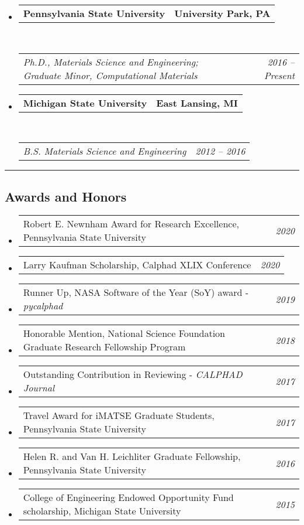 \documentclass[10pt,letterpaper]{article}
\makeatletter
\newcommand{\headerrow}[2]
{\begin{tabular*}{\linewidth}{l@{\extracolsep{\fill}}r}
  #1 &
  #2 \\
\end{tabular*}}
\makeatother
\begin{document}
\begin{itemize}
  \parskip=0.1em

  \item
  \headerrow
    {\textbf{Pennsylvania State University}}
    {\textbf{University Park, PA}}
  \\
  \headerrow
    {\emph{Ph.D., Materials Science and Engineering; Graduate Minor, Computational Materials}}
    {\emph{2016 -- Present}}


  \item
  \headerrow
    {\textbf{Michigan State University}}
    {\textbf{East Lansing, MI}}
  \\
  \headerrow
    {\emph{B.S. Materials Science and Engineering}}
    {\emph{2012 -- 2016}}

\end{itemize}

\hrule
\vspace{-0.6em}
\subsection*{Awards and Honors}

\begin{itemize}
  \parskip=0.1em
  \item
  \headerrow
    {Robert E. Newnham Award for Research Excellence, Pennsylvania State University} {\emph{2020}}
  \item
  \headerrow
    {Larry Kaufman Scholarship, Calphad XLIX Conference} {\emph{2020}}
  \item
  \headerrow
    {Runner Up, NASA Software of the Year (SoY) award - \emph{pycalphad}} {\emph{2019}}
  \item
  \headerrow
    {Honorable Mention, National Science Foundation Graduate Research Fellowship Program} {\emph{2018}}
  \item
  \headerrow
    {Outstanding Contribution in Reviewing - \emph{CALPHAD Journal}} {\emph{2017}}
  \item  %
  \headerrow
    {Travel Award for iMATSE Graduate Students, Pennsylvania State University} {\emph{2017}}
  \item
  \headerrow
    {Helen R. and Van H. Leichliter Graduate Fellowship, Pennsylvania State University} {\emph{2016}}
  \item
  \headerrow
    {College of Engineering Endowed Opportunity Fund scholarship, Michigan State University} {\emph{2015}}

\end{itemize}
\end{document}

